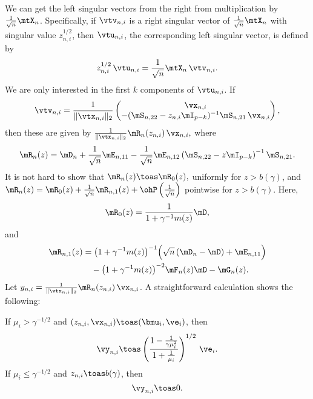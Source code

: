 We can get the left singular vectors from the right from multiplication
by $\frac{1}{\sqrt{n}} \mtX_n$.  Specifically, if $\vtv_{n,i}$ is a right
singular vector of $\frac{1}{\sqrt{n}} \mtX_n$ with singular value
$z_{n,i}^{1/2}$, then $\vtu_{n,i}$, the corresponding left singular vector,
is defined by
\[
    z_{n,i}^{1/2} \,
    \vtu_{n,i}
        = 
        \frac{1}{\sqrt{n}}
        \mtX_n \,
        \vtv_{n,i}.
\]
We are only interested in the first $k$ components of $\vtu_{n,i}$.  If
\[
    \vtv_{n,i}
    =
    \frac{1}{\| \vtx_{n,i} \|_2 }
    \left(
    \begin{matrix}
        \vx_{n,i} \\
        -( \mS_{n,22} - z_{n,i} \mI_{p-k} )^{-1} \mS_{n,21} \, \vx_{n,i}
    \end{matrix}
    \right),
\]
then these are given by
\(
    \frac{1}{\| \vtx_{n,i} \|_2 } \mR_n(z_{n,i}) \, \vx_{n,i},
\)
where
\[
    \mR_n(z)
    =
    \mD_n 
    + 
    \frac{1}{\sqrt{n}}
    \mE_{n,11}
    - 
    \frac{1}{\sqrt{n}}
    \mE_{n,12}
    \left( \mS_{n,22} - z \mI_{p-k} \right)^{-1}
    \mS_{n,21}.
\]
It is not hard to show that
\(
    \mR_n(z) \toas \mR_0(z),
\)
uniformly for $z > b(\gamma)$, and
\(
    \mR_n(z) 
        = 
            \mR_0(z) 
            + 
            \frac{1}{\sqrt{n}} \mR_{n,1}(z) 
            + 
            \ohP\left( \frac{1}{\sqrt{n}} \right)
\)
pointwise for $z > b(\gamma)$.  Here,
\[
    \mR_0(z) = \frac{1}{ 1 + \gamma^{-1} m(z) } \mD,
\]
and
\[
    \begin{split}
    \mR_{n,1}(z)
    &=
    \big( 1 + \gamma^{-1} m(z) \big)^{-1}
    \Big(
        \sqrt{n} \left( \mD_n  - \mD \right)
        +
        \mE_{n,11}
    \Big) \\
    &\quad- 
    \big( 1 + \gamma^{-1} m(z) \big)^{-2}
    \mF_{n}(z) \mD
    - 
    \mG_n(z).
    \end{split}
\]
Let $y_{n,i} = \frac{1}{\| \vtx_{n,i} \|_2 } \mR_n(z_{n,i}) \, \vx_{n,i}$.
A straightforward calculation shows the following:

\begin{lemma}
    If $\mu_i > \gamma^{-1/2}$ and 
    $(z_{n,i}, \vx_{n,i}) \toas (\bmu_i, \ve_i)$, then 
    \[
        \vy_{n,i}
            \toas
                \left(
                \frac{1 - \tfrac{ 1 }{ \gamma \mu_i^2 } }
                     { 1 + \tfrac{1}{\mu_i} } \right)^{1/2} \,
                \ve_i .
    \]
    If $\mu_i \leq \gamma^{-1/2}$ and $z_{n,i} \toas b(\gamma)$, then
    \[
        \vy_{n,i} \toas 0.
    \]
\end{lemma}

